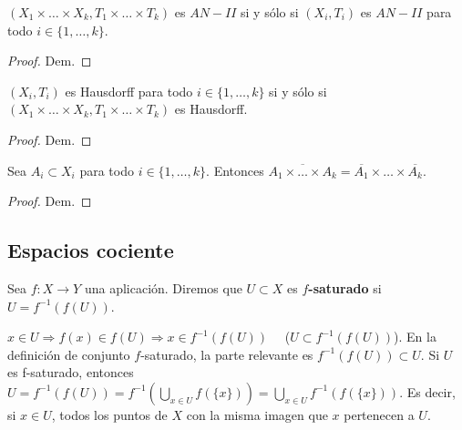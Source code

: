 \begin{nprop}
  $(X_1 \times \dots \times X_k, T_1 \times \dots \times T_k)$ es $AN-II$ si y sólo si $(X_i,T_i)$ es $AN-II$ para todo $i \in \{1, \dots, k\}$.
\end{nprop}
\begin{proof}
    Dem.
\end{proof}

\begin{nprop}
  $(X_i,T_i)$ es Hausdorff para todo $i \in \{1, \dots, k\}$ si y sólo si $(X_1 \times \dots \times X_k, T_1 \times \dots \times T_k)$ es Hausdorff.
\end{nprop}
\begin{proof}
    Dem.
\end{proof}

\begin{lema}
  Sea $A_i \subset X_i$ para todo $i \in \{1, \dots, k\}$. Entonces $\overline{A_1 \times \dots \times A_k} = \overline{A_1} \times \dots \times \overline{A_k}$.
\end{lema}
\begin{proof}
    Dem.
\end{proof}

\subsection{Espacios cociente}


\begin{ndef}
  Sea $f: X \to Y$ una aplicación. Diremos que $U \subset X$ es \textbf{$\mathit{f}$-saturado} si $U=f^{-1}(f(U))$.
\end{ndef}
$x \in U \Rightarrow f(x) \in f(U) \Rightarrow x \in f^{-1}(f(U)) \quad$ ($U \subset f^{-1}(f(U))$). En la definición de conjunto $\mathit{f}$-saturado, la parte relevante es $f^{-1}(f(U)) \subset U$. Si $U$ es f-saturado, entonces $U=f^{-1}(f(U))=f^{-1}\left( \bigcup_{x \in U} f(\{x\}) \right) = \bigcup_{x \in U} f^{-1}\left( f(\{x\}) \right)$. Es decir, si $x \in U$, todos los puntos de $X$ con la misma imagen que $x$ pertenecen a $U$.

